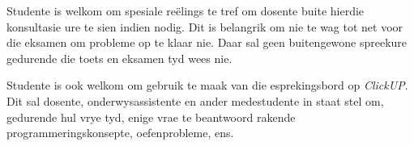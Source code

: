         Studente is welkom om spesiale re\"{e}lings te tref om dosente buite
        hierdie konsultasie ure te sien indien nodig.  Dit is belangrik om nie
        te wag tot net voor die eksamen om probleme op te klaar nie.  Daar sal
        geen buitengewone spreekure gedurende die toets en eksamen tyd wees
        nie.

        Studente is ook welkom om gebruik te maak van die esprekingsbord
        op \textit{ClickUP}.  Dit sal dosente, onderwysassistente en ander
        medestudente in staat stel om, gedurende hul vrye tyd, enige vrae te
        beantwoord rakende programmeringskonsepte, oefenprobleme, ens.
